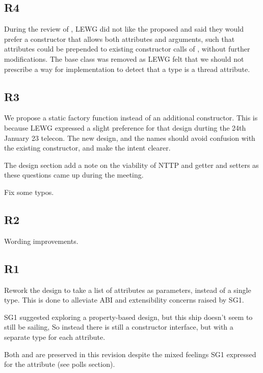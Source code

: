 \documentclass{wg21}
\begin{document}
\subsection{R4}

During the review of , LEWG did not like the proposed  and said they would prefer a constructor
that allows both attributes and arguments, such that attributes could be prepended to existing constructor calls of , without further modifications.
The  base class was removed as LEWG felt that we should not prescribe a way for implementation to detect that a type is a thread attribute.

\subsection{R3}

We propose a  static factory function
instead of an additional constructor.
This is because LEWG expressed a slight preference for that design durting the 24th January 23 telecon.
The new design, and the names should avoid confusion with the existing constructor, and make the intent clearer.

The design section add a note on the viability of NTTP and getter and setters as these questions came up during the meeting.

Fix some typos.

\subsection{R2}

Wording improvements.

\subsection{R1}

Rework the design to take a list of attributes as parameters, instead of a single type.
This is done to alleviate ABI and extensibility concerns raised by SG1.

SG1 suggested exploring a property-based design, but this ship doesn't seem to still be sailing,
So instead there is still a constructor interface, but with a separate type for each attribute.

Both  and  are preserved in this revision despite the
mixed feelings SG1 expressed for the  attribute (see polls section).
\end{document}
